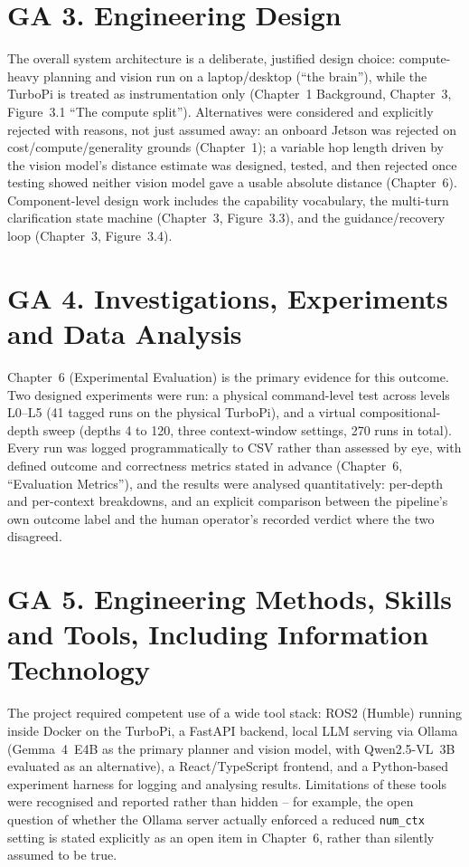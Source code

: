 \section*{GA 3. Engineering Design}

The overall system architecture is a deliberate, justified design choice:
compute-heavy planning and vision run on a laptop/desktop (``the brain''),
while the TurboPi is treated as instrumentation only (Chapter~1 Background,
Chapter~3, Figure~3.1 ``The compute split''). Alternatives were considered
and explicitly rejected with reasons, not just assumed away: an onboard
Jetson was rejected on cost/compute/generality grounds (Chapter~1); a
variable hop length driven by the vision model's distance estimate was
designed, tested, and then rejected once testing showed neither vision
model gave a usable absolute distance (Chapter~6). Component-level design
work includes the capability vocabulary, the multi-turn clarification state
machine (Chapter~3, Figure~3.3), and the guidance/recovery loop
(Chapter~3, Figure~3.4).

\section*{GA 4. Investigations, Experiments and Data Analysis}

Chapter~6 (Experimental Evaluation) is the primary evidence for this
outcome. Two designed experiments were run: a physical command-level test
across levels L0--L5 (41 tagged runs on the physical TurboPi), and a virtual
compositional-depth sweep (depths 4 to 120, three context-window settings,
270 runs in total). Every run was logged programmatically to CSV rather than
assessed by eye, with defined outcome and correctness metrics stated in
advance (Chapter~6, ``Evaluation Metrics''), and the results were analysed
quantitatively: per-depth and per-context breakdowns, and an explicit
comparison between the pipeline's own outcome label and the human
operator's recorded verdict where the two disagreed.

\section*{GA 5. Engineering Methods, Skills and Tools, Including Information
Technology}

The project required competent use of a wide tool stack: ROS2 (Humble)
running inside Docker on the TurboPi, a FastAPI backend, local LLM serving
via Ollama (Gemma~4~E4B as the primary planner and vision model, with
Qwen2.5-VL~3B evaluated as an alternative), a React/TypeScript frontend, and
a Python-based experiment harness for logging and analysing results.
Limitations of these tools were recognised and reported rather than hidden
-- for example, the open question of whether the Ollama server actually
enforced a reduced \texttt{num\_ctx} setting is stated explicitly as an
open item in Chapter~6, rather than silently assumed to be true.

